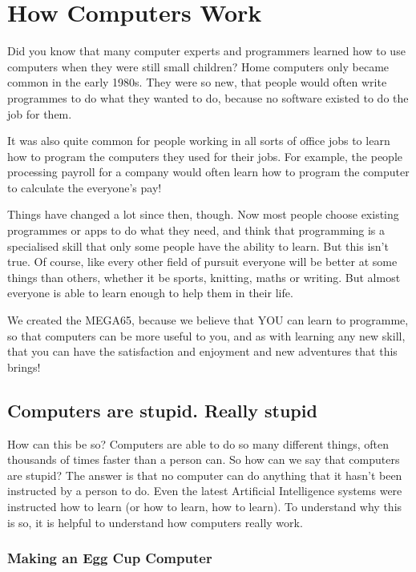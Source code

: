 \chapter{How Computers Work}

Did you know that many computer experts and programmers learned how to
use computers when they were still small children?
Home computers only became common in the early 1980s. They were so new,
that people would often write programmes to do
what they wanted to do, because no software existed to do the job for them.

It was also quite common for people working in all
sorts of office jobs to learn how to program the computers they used for
their jobs.  For example, the people processing payroll
for a company would often learn how to program the computer to calculate
the everyone's pay!

Things have changed a lot since then, though.
Now most people choose existing programmes or apps to do what they need,
and think that programming is a specialised skill that only some people
have the ability to learn.
But this isn't true.  Of course, like every other field of pursuit
everyone will be better at some things than others,
whether it be sports, knitting, maths or writing. But almost
everyone is able to learn enough to help them in their life.

We created the MEGA65, because we believe that YOU can learn to
programme, so that computers can be more useful to you, and as with
learning any new skill, that you can have the satisfaction and enjoyment
and new adventures that this brings!


\section{Computers are stupid. Really stupid}

How can this be so? Computers are able to do so many different things, often thousands of times faster than a person can.
So how can we say that computers are stupid?  The answer is that no computer can do anything that it hasn't been instructed
by a person to do.  Even the latest Artificial Intelligence systems were instructed how to learn (or how to learn, how to learn).
To understand why this is so, it is helpful to understand how computers really work.

\subsection{Making an Egg Cup Computer}

